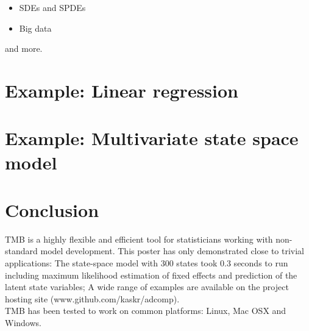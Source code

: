 \documentclass[largefonts]{sciposter}
\begin{document}
\begin{multicols}{3}
\begin{itemize}
\item SDEs and SPDEs
\item Big data
\end{itemize}
and more.





\section{Example: Linear regression}


\section{Example: Multivariate state space model}


\section{Conclusion}
TMB is a highly flexible and efficient tool for statisticians working
with non-standard model development. This poster has only demonstrated
close to trivial applications: The state-space model with 300 states
took 0.3 seconds to run including maximum likelihood estimation of
fixed effects and prediction of the latent state variables; A wide
range of examples are available on the project hosting site (www.github.com/kaskr/adcomp).\\
TMB has been tested to work on common platforms: Linux, Mac OSX and
Windows.

\end{multicols}
\end{document}

